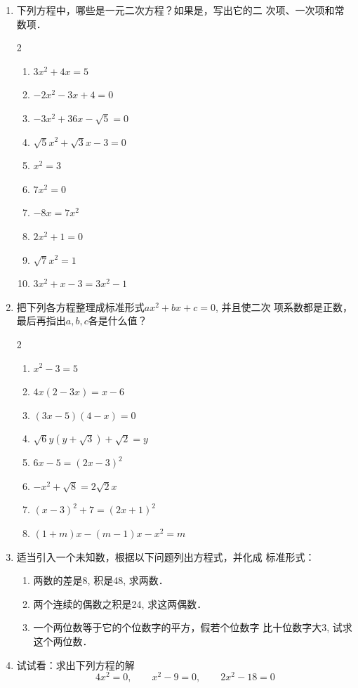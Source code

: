\begin{ex}
\begin{enumerate}
    \item 
    下列方程中，哪些是一元二次方程？如果是，写出它的二
    次项、一次项和常数项．
    \begin{multicols}{2}
        \begin{enumerate}
       \item $3x^2+4x=5$
       \item $-2x^2-3x+4=0$
       \item $-3x^2+36x-\sqrt{5}=0$
       \item  $\sqrt{5}x^2+\sqrt{3}x-3=0$
           \item  $x^2=3$
       \item  $7x^2=0$
           \item  $ -8x=7x^2$
           \item  $2x^2+1=0$
       \item  $\sqrt{7}x^2=1$ 
       \item  $3x^2+x-3=3x^2-1$
   \end{enumerate}
    \end{multicols}
   
   \item 把下列各方程整理成标准形式$ax^2+bx+c=0$, 并且使二次
    项系数都是正数，最后再指出$a,b,c$各是什么值？
    \begin{multicols}{2}
  \begin{enumerate}
    \item  $x^2-3=5$
    \item $4x(2-3x)=x-6$
    \item $(3x-5)(4-x)=0$
    \item $\sqrt{6}y(y+\sqrt{3})+\sqrt{2}=y$
    \item $6x-5=(2x-3)^2$ 
    \item $-x^2+\sqrt{8}=2\sqrt{2}x$
        \item $(x-3)^2+7=(2x+1)^2$
        \item $(1+m)x- (m-1)x-x^2=m$
\end{enumerate}      
    \end{multicols}

    \item 适当引入一个未知数，根据以下问题列出方程式，并化成
    标准形式：
    \begin{enumerate}
        \item 两数的差是8, 积是48, 求两数．
        \item 两个连续的偶数之积是24, 求这两偶数．
        \item 一个两位数等于它的个位数字的平方，假若个位数字
    比十位数字大3, 试求这个两位数．
    \end{enumerate}
\item 试试看：求出下列方程的解
\[4x^2=0,\qquad  x^2-9=0,\qquad 2x^2-18=0\]
\end{enumerate}    
\end{ex}

